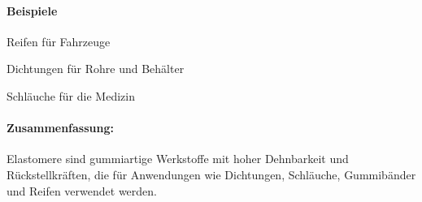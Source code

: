 \documentclass{article}
\begin{document}
\begin{multicols}{3}
\paragraph{Beispiele}
\begin{compactitem}
\item Reifen für Fahrzeuge
\item Dichtungen für Rohre und Behälter
\item Schläuche für die Medizin
\end{compactitem}
\paragraph{Zusammenfassung:} Elastomere sind gummiartige Werkstoffe mit hoher Dehnbarkeit und Rückstellkräften, die für Anwendungen wie Dichtungen, Schläuche, Gummibänder und Reifen verwendet werden.


\end{multicols}

\clearpage


\newpage
\pagestyle{fancy}
\fancyhf{}
\end{document}
